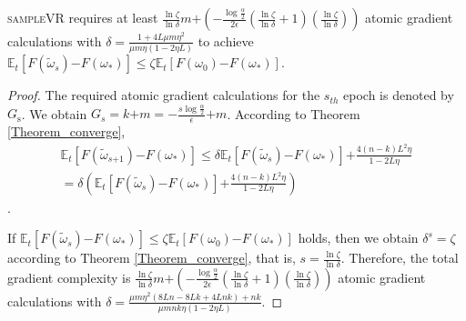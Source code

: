 \documentclass[letterpaper]{article}
\begin{document}





\begin{Theorem}
\label{theorem_gradient_complexity}
\textsc{sampleVR} requires at least  $\frac{\ln \zeta}{\ln \delta}m\mathrm{+}\left( \mathrm{-} \frac{\log\frac{\alpha}{2}}{2\epsilon} (\frac{\ln \zeta}{\ln \delta}+1)(\frac{\ln \zeta}{\ln \delta})\right)$ atomic gradient calculations with $\delta=\frac{1+4L\mu m \eta^2}{  \mu m \eta (1-2\eta L)  }$ to achieve $\mathbb{E}_t[F(\tilde{\omega}_s)\mathrm{-}F(\omega_\ast)] \le \zeta \mathbb{E}_t[F(\omega_0)\mathrm{-}F(\omega_\ast)]$.
\end{Theorem}
\begin{proof}

The required atomic gradient calculations for the $s_{th}$ epoch is denoted by $G_\mathrm{s}$. We obtain
$G_s = k \mathrm{+}m = \mathrm{-} \frac{s\log\frac{\alpha}{2}}{\epsilon}\mathrm{+}m$. According to Theorem \ref{Theorem_converge}, 
\begin{equation}
\begin{array}{ll}
\mathbb{E}_t[F(\tilde{\omega}_{s\mathrm{+}1}) \mathrm{-} F(\omega_\ast)]  \le \delta \mathbb{E}_t[F(\tilde{\omega}_s)\mathrm{-}F(\omega_\ast)] \mathrm{+} \frac{4(n-k)L^2\eta}{1-2L\eta}\\
= \delta \left( \mathbb{E}_t[F(\tilde{\omega}_s)\mathrm{-}F(\omega_\ast)] \mathrm{+} \frac{4(n-k)L^2\eta}{1-2L\eta} \right)
\end{array}
\end{equation}.


If $\mathbb{E}_t[F(\tilde{\omega}_s)\mathrm{-}F(\omega_\ast)] \le \zeta \mathbb{E}_t[F(\omega_0)\mathrm{-}F(\omega_\ast)]$ holds, then we obtain $\delta^s = \zeta$ according to Theorem \ref{Theorem_converge}, that is, $s=\frac{\ln \zeta}{\ln \delta}$. Therefore, the total  gradient complexity is 
$\frac{\ln \zeta}{\ln \delta}m\mathrm{+}\left( \mathrm{-} \frac{\log\frac{\alpha}{2}}{2\epsilon} (\frac{\ln \zeta}{\ln \delta}+1)(\frac{\ln \zeta}{\ln \delta})\right)$ atomic gradient calculations with $\delta=\frac{\mu m \eta^2 (8Ln-8Lk+4Lnk)+nk}{  \mu m nk \eta (1-2\eta L)  }$. 


\end{proof}
\end{document}
